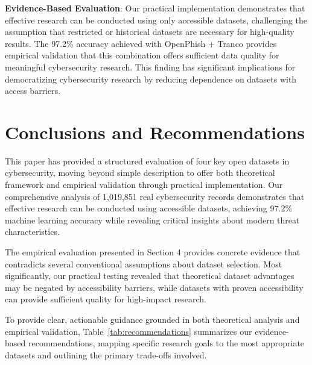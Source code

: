 \documentclass[journal,article,submit,pdftex,moreauthors]{Definitions/mdpi}
\begin{document}
\textbf{Evidence-Based Evaluation}: Our practical implementation demonstrates that effective research can be conducted using only accessible datasets, challenging the assumption that restricted or historical datasets are necessary for high-quality results. The 97.2\% accuracy achieved with OpenPhish + Tranco provides empirical validation that this combination offers sufficient data quality for meaningful cybersecurity research. This finding has significant implications for democratizing cybersecurity research by reducing dependence on datasets with access barriers.

\section{Conclusions and Recommendations}

This paper has provided a structured evaluation of four key open datasets in cybersecurity, moving beyond simple description to offer both theoretical framework and empirical validation through practical implementation. Our comprehensive analysis of 1,019,851 real cybersecurity records demonstrates that effective research can be conducted using accessible datasets, achieving 97.2\% machine learning accuracy while revealing critical insights about modern threat characteristics.

The empirical evaluation presented in Section 4 provides concrete evidence that contradicts several conventional assumptions about dataset selection. Most significantly, our practical testing revealed that theoretical dataset advantages may be negated by accessibility barriers, while datasets with proven accessibility can provide sufficient quality for high-impact research.

To provide clear, actionable guidance grounded in both theoretical analysis and empirical validation, Table~\ref{tab:recommendations} summarizes our evidence-based recommendations, mapping specific research goals to the most appropriate datasets and outlining the primary trade-offs involved.
\end{document}
